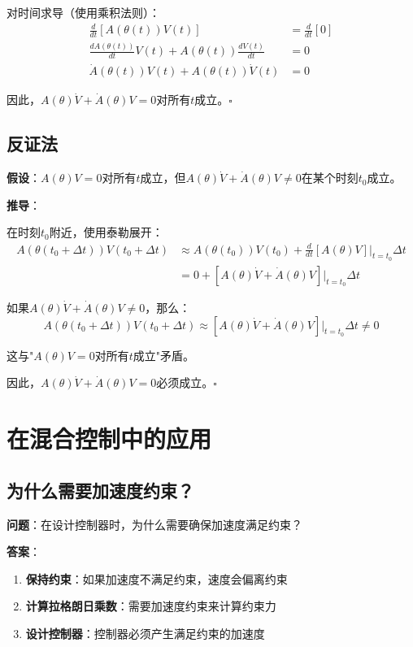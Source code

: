 \documentclass[12pt,a4paper]{article}
\begin{document}
对时间求导（使用乘积法则）：
\begin{align}
\frac{d}{dt}[A(\theta(t))V(t)] &= \frac{d}{dt}[0] \\
\frac{dA(\theta(t))}{dt}V(t) + A(\theta(t))\frac{dV(t)}{dt} &= 0 \\
\dot{A}(\theta(t))V(t) + A(\theta(t))\dot{V}(t) &= 0
\end{align}

因此，$A(\theta)\dot{V} + \dot{A}(\theta)V = 0$对所有$t$成立。$\square$

\subsection{反证法}

\textbf{假设}：$A(\theta)V = 0$对所有$t$成立，但$A(\theta)\dot{V} + \dot{A}(\theta)V \neq 0$在某个时刻$t_0$成立。

\textbf{推导}：

在时刻$t_0$附近，使用泰勒展开：
\begin{align}
A(\theta(t_0 + \Delta t))V(t_0 + \Delta t) &\approx A(\theta(t_0))V(t_0) + \frac{d}{dt}[A(\theta)V]\Big|_{t=t_0}\Delta t \\
&= 0 + [A(\theta)\dot{V} + \dot{A}(\theta)V]\Big|_{t=t_0}\Delta t
\end{align}

如果$A(\theta)\dot{V} + \dot{A}(\theta)V \neq 0$，那么：
\begin{equation}
A(\theta(t_0 + \Delta t))V(t_0 + \Delta t) \approx [A(\theta)\dot{V} + \dot{A}(\theta)V]\Big|_{t=t_0}\Delta t \neq 0
\end{equation}

这与"$A(\theta)V = 0$对所有$t$成立"矛盾。

因此，$A(\theta)\dot{V} + \dot{A}(\theta)V = 0$必须成立。$\square$

\section{在混合控制中的应用}

\subsection{为什么需要加速度约束？}

\textbf{问题}：在设计控制器时，为什么需要确保加速度满足约束？

\textbf{答案}：
\begin{enumerate}
\item \textbf{保持约束}：如果加速度不满足约束，速度会偏离约束
\item \textbf{计算拉格朗日乘数}：需要加速度约束来计算约束力
\item \textbf{设计控制器}：控制器必须产生满足约束的加速度
\end{enumerate}
\end{document}
